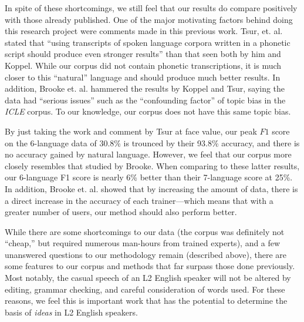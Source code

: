 \documentclass[11pt]{article}
\begin{document}
In spite of these shortcomings, we still feel that our results do compare positively with those already published.  One of the major motivating factors behind doing this research project were comments made in this previous work.  Tsur, et. al.  stated that ``using transcripts of spoken language corpora written in a phonetic script should produce even stronger results'' than that seen both by him and Koppel.  While our corpus did not contain phonetic transcriptions, it is much closer to this ``natural'' language and should produce much better results.  In addition, Brooke et. al.  hammered the results by Koppel and Tsur, saying the data had ``serious issues'' such as the ``confounding factor'' of topic bias in the \emph{ICLE} corpus.  To our knowledge, our corpus does not have this same topic bias.

By just taking the work and comment by Tsur at face value, our peak $F1$ score on the 6-language data of 30.8\% is trounced by their 93.8\% accuracy, and there is no accuracy gained by natural language.  However, we feel that our corpus more closely resembles that studied by Brooke.  When comparing to these latter results, our 6-language F1 score is nearly 6\% better than their 7-language score at 25\%.  In addition, Brooke et. al. showed that by increasing the amount of data, there is a direct increase in the accuracy of each trainer---which means that with a greater number of users, our method should also perform better.

While there are some shortcomings to our data (the corpus was definitely not ``cheap,'' but required numerous man-hours from trained experts), and a few unanswered questions to our methodology remain (described above), there are some features to our corpus and methods that far surpass those done previously.  Most notably, the casual speech of an L2 English speaker will not be altered by editing, grammar checking, and careful consideration of words used.  For these reasons, we feel this is important work that has the potential to determine the basis of {\it ideas} in L2 English speakers.  

\end{document}
